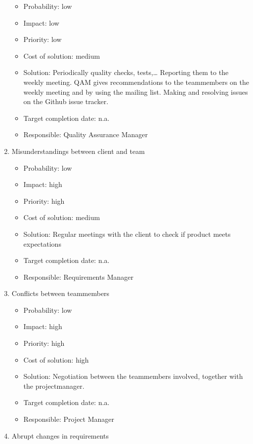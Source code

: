\documentclass[12pt]{article}
\begin{document}
\begin{enumerate}
  \begin{itemize}
  \itemsep1pt\parskip0pt
  \item
    Probability: low
  \item
    Impact: low
  \item
    Priority: low
  \item
    Cost of solution: medium
  \item
    Solution: Periodically quality checks, tests,\ldots{} Reporting them
    to the weekly meeting. QAM gives recommendations to the teammembers
    on the weekly meeting and by using the mailing list. Making and
    resolving issues on the Github issue tracker.
  \item
    Target completion date: n.a.
  \item
    Responsible: Quality Assurance Manager
  \end{itemize}
\item
  Misunderstandings between client and team

  \begin{itemize}
  \itemsep1pt\parskip0pt
  \item
    Probability: low
  \item
    Impact: high
  \item
    Priority: high
  \item
    Cost of solution: medium
  \item
    Solution: Regular meetings with the client to check if product meets
    expectations
  \item
    Target completion date: n.a.
  \item
    Responsible: Requirements Manager
  \end{itemize}
\item
  Conflicts between teammembers

  \begin{itemize}
  \itemsep1pt\parskip0pt
  \item
    Probability: low
  \item
    Impact: high
  \item
    Priority: high
  \item
    Cost of solution: high
  \item
    Solution: Negotiation between the teammembers involved, together
    with the projectmanager.
  \item
    Target completion date: n.a.
  \item
    Responsible: Project Manager
  \end{itemize}
\item
  Abrupt changes in requirements


\end{enumerate}
\end{document}
